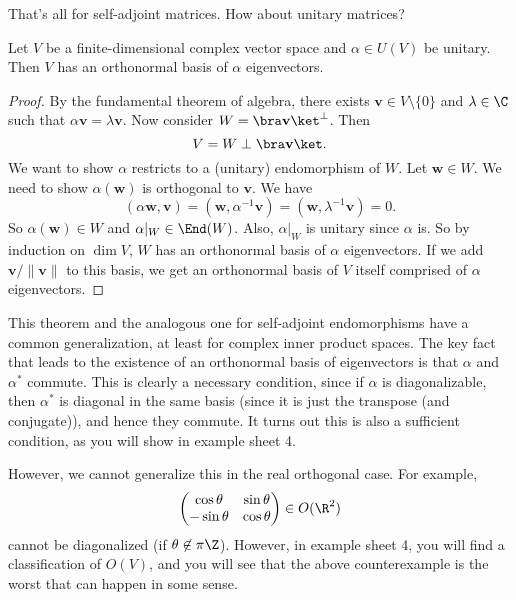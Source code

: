 \documentclass[a4paper]{article}
\begin{document}
That's all for self-adjoint matrices. How about unitary matrices?
\begin{thm}
  Let $V$ be a finite-dimensional complex vector space and $\alpha \in U(V)$ be unitary. Then $V$ has an orthonormal basis of $\alpha$ eigenvectors.
\end{thm}

\begin{proof}
  By the fundamental theorem of algebra, there exists $\mathbf{v} \in V\setminus \{0\}$ and $\lambda \in \C$ such that $\alpha \mathbf{v} = \lambda \mathbf{v}$. Now consider $W = \bra \mathbf{v}\ket^\perp$. Then
  \[
    V = W \perp \bra \mathbf{v}\ket.
  \]
  We want to show $\alpha$ restricts to a (unitary) endomorphism of $W$. Let $\mathbf{w} \in W$. We need to show $\alpha(\mathbf{w})$ is orthogonal to $\mathbf{v}$. We have
  \[
    (\alpha \mathbf{w}, \mathbf{v}) = (\mathbf{w}, \alpha^{-1}\mathbf{v}) = (\mathbf{w}, \lambda^{-1} \mathbf{v}) = 0.
  \]
  So $\alpha(\mathbf{w}) \in W$ and $\alpha|_W \in \End(W)$. Also, $\alpha|_W$ is unitary since $\alpha$ is. So by induction on $\dim V$, $W$ has an orthonormal basis of $\alpha$ eigenvectors. If we add $\mathbf{v}/\|\mathbf{v}\|$ to this basis, we get an orthonormal basis of $V$ itself comprised of $\alpha$ eigenvectors.
\end{proof}
This theorem and the analogous one for self-adjoint endomorphisms have a common generalization, at least for complex inner product spaces. The key fact that leads to the existence of an orthonormal basis of eigenvectors is that $\alpha$ and $\alpha^*$ commute. This is clearly a necessary condition, since if $\alpha$ is diagonalizable, then $\alpha^*$ is diagonal in the same basis (since it is just the transpose (and conjugate)), and hence they commute. It turns out this is also a sufficient condition, as you will show in example sheet 4.

However, we cannot generalize this in the real orthogonal case. For example,
\[
  \begin{pmatrix}
    \cos \theta & \sin \theta\\
    - \sin \theta & \cos \theta
  \end{pmatrix} \in O(\R^2)
\]
cannot be diagonalized (if $\theta \not\in \pi \Z$). However, in example sheet 4, you will find a classification of $O(V)$, and you will see that the above counterexample is the worst that can happen in some sense.
\end{document}
